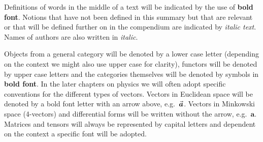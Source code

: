 \documentclass[11pt, a4paper]{report}
\begin{document}
   Definitions of words in the middle of a text will be indicated by the use of \textbf{bold font}. Notions that have not been defined in this summary but that are relevant or that will be defined further on in the compendium are indicated by \textit{italic text}. Names of authors are also written in \textit{italic}.

   Objects from a general category will be denoted by a lower case letter (depending on the context we might also use upper case for clarity), functors will be denoted by upper case letters and the categories themselves will be denoted by symbols in \textbf{bold font}. In the later chapters on physics we will often adopt specific conventions for the different types of vectors. Vectors in Euclidean space will be denoted by a bold font letter with an arrow above, e.g.~$\vec{\boldsymbol{a}}$. Vectors in Minkowski space (4-vectors) and differential forms will be written without the arrow, e.g.~$\mathbf{a}$. Matrices and tensors will always be represented by capital letters and dependent on the context a specific font will be adopted.
\end{document}

